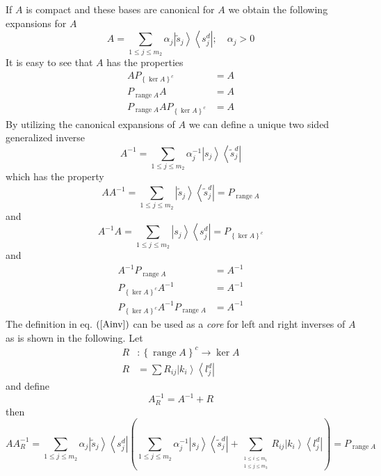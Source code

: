 \documentclass[aps,preprint]{revtex4}%
\begin{document}
If $A$ is compact and these bases are canonical for $A$ we obtain the
following expansions for $A$
\begin{equation}
A=\sum_{1\leq j\leq m_{2}}\alpha_{j}\left\vert \tilde{s}_{j}\right\rangle
\left\langle s_{j}^{d}\right\vert ;\quad\alpha_{j}>0
\end{equation}
It is easy to see that $A$ has the properties
\begin{align}
AP_{\left\{  \ker A\right\}  ^{c}}  & =A\nonumber\\
P_{\operatorname{range}A}A  & =A\nonumber\\
P_{\operatorname{range}A}AP_{\left\{  \ker A\right\}  ^{c}}  & =A
\end{align}
By utilizing the canonical expansions of $A$ we can define a unique two sided
generalized inverse
\begin{equation}
A^{-1}=\sum_{1\leq j\leq m_{2}}\alpha_{j}^{-1}\left\vert s_{j}\right\rangle
\left\langle \tilde{s}_{j}^{d}\right\vert \label{Ainv}%
\end{equation}
which has the property
\begin{equation}
AA^{-1}=\sum_{1\leq j\leq m_{2}}\left\vert \tilde{s}_{j}\right\rangle
\left\langle \tilde{s}_{j}^{d}\right\vert =P_{\operatorname{range}A}%
\end{equation}
and
\begin{equation}
A^{-1}A=\sum_{1\leq j\leq m_{2}}\left\vert s_{j}\right\rangle \left\langle
s_{j}^{d}\right\vert =P_{\left\{  \ker A\right\}  ^{c}}%
\end{equation}
and\
\begin{align}
A^{-1}P_{\operatorname{range}A}  & =A^{-1}\nonumber\\
P_{\left\{  \ker A\right\}  ^{c}}A^{-1}  & =A^{-1}\nonumber\\
P_{\left\{  \ker A\right\}  ^{c}}A^{-1}P_{\operatorname{range}A}  & =A^{-1}%
\end{align}
The definition in eq. $\left(  \ref{Ainv}\right)  $ can be used as a
\emph{core} for left and right inverses of $A$ as is shown in the following.
Let
\begin{align}
R  & :\left\{  \operatorname{range}A\right\}  ^{c}\longrightarrow\ker
A\nonumber\\
R  & =\sum R_{ij}\left\vert k_{i}\right\rangle \left\langle l_{j}%
^{d}\right\vert
\end{align}
and define
\begin{equation}
A_{R}^{-1}=A^{-1}+R
\end{equation}
then
\begin{equation}
AA_{R}^{-1}=\sum_{1\leq j\leq m_{2}}\alpha_{j}\left\vert \tilde{s}%
_{j}\right\rangle \left\langle s_{j}^{d}\right\vert \left(  \sum_{1\leq j\leq
m_{2}}\alpha_{j}^{-1}\left\vert s_{j}\right\rangle \left\langle \tilde{s}%
_{j}^{d}\right\vert +\sum_{_{\substack{1\leq i\leq m_{1} \\1\leq j\leq m_{3}
}}}R_{ij}\left\vert k_{i}\right\rangle \left\langle l_{j}^{d}\right\vert
\right)  =P_{\operatorname{range}A}%
\end{equation}
\end{document}
